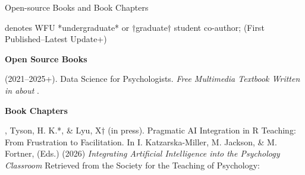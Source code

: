 

\begin{rSection}{\textrm{Open-source Books and Book Chapters}}%
\vspace{-1mm}\begin{center}\footnotesize{denotes WFU *undergraduate* or $\dagger$graduate$\dagger$ student co-author; (First Published–Latest Update+)}\end{center}\vspace{-1mm}
{\large {\bf Open Source Books}}\begin{etaremune}
\item  \meb (2021–2025+). Data Science for Psychologists. \textit{Free Multimedia Textbook Written in \R about \R}. 
\end{etaremune}
{\large \bf Book Chapters}
\begin{etaremune}
\item \meb, Tyson, H. K.*, \& Lyu, X$\dagger$ (in press). Pragmatic AI Integration in R Teaching: From Frustration to Facilitation.  In I. Katzarska-Miller, M. Jackson, \& M. Fortner,  (Eds.) (2026) \textit{Integrating Artificial Intelligence into the Psychology Classroom} Retrieved from the Society for the Teaching of Psychology: \href{https://teachpsych.org/ebooks/index}{\small\color{blue}{teachpsych.org/ebooks/}}
\end{etaremune}
\end{rSection}%
